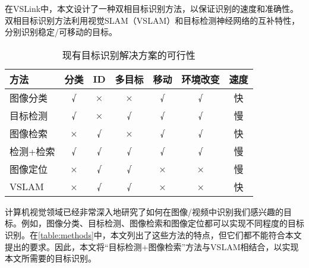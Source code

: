 在VSLink中，本文设计了一种双相目标识别方法，以保证识别的速度和准确性。双相目标识别方法利用视觉SLAM（VSLAM）和目标检测神经网络的互补特性，分别识别稳定/可移动的目标。

\begin{table}[htbp]
	  \centering
	  \caption{\label{table:methods}现有目标识别解决方案的可行性}
	  \begin{tabular}{|l|c|c|c|c|c|c|}\hline
	  方法 &
		分类 &
		ID &
		多目标 &
		移动 &
		环境改变 &
		速度 \\
		\hline 图像分类\cite{he2019bag} &
		{\color[HTML]{355421} √} &
		{\color[HTML]{BF0000} ×} &
		{\color[HTML]{BF0000} ×} &
		{\color[HTML]{355421} √} &
		{\color[HTML]{355421} √} &
		{\color[HTML]{355421} 快} \\ \hline
	  目标检测\cite{zou2019object} &
		{\color[HTML]{355421} √} &
		{\color[HTML]{BF0000} ×} &
		{\color[HTML]{355421} √} &
		{\color[HTML]{355421} √} &
		{\color[HTML]{355421} √} &
		{\color[HTML]{BF0000} 慢} \\ \hline
	  图像检索\cite{philbin2008lost,zheng2017sift} &
		{\color[HTML]{BF0000} ×} &
		{\color[HTML]{355421} √} &
		{\color[HTML]{BF0000} ×} &
		{\color[HTML]{355421} √} &
		{\color[HTML]{355421} √} &
		{\color[HTML]{355421} 快} \\ \hline
	  检测+检索 &
		{\color[HTML]{355421} √} &
		{\color[HTML]{355421} √} &
		{\color[HTML]{355421} √} &
		{\color[HTML]{355421} √} &
		{\color[HTML]{355421} √} &
		{\color[HTML]{BF0000} 慢} \\ \hline
	  图像定位\cite{sattler2011fast} &
		{\color[HTML]{BF0000} ×} &
		{\color[HTML]{355421} √} &
		{\color[HTML]{355421} √} &
		{\color[HTML]{BF0000} ×} &
		{\color[HTML]{BF0000} ×} &
		{\color[HTML]{BF0000} 慢} \\ \hline
	  VSLAM\cite{liu2021edgesharing} &
		{\color[HTML]{BF0000} ×} &
		{\color[HTML]{355421} √} &
		{\color[HTML]{355421} √} &
		{\color[HTML]{BF0000} ×} &
		{\color[HTML]{BF0000} ×} &
		{\color[HTML]{355421} 快} \\ \hline
	  \end{tabular}
	\end{table}
  
计算机视觉领域已经非常深入地研究了如何在图像/视频中识别我们感兴趣的目标。例如，图像分类\cite{he2019bag}、目标检测\cite{zou2019object}、图像检索\cite{philbin2008lost,zheng2017sift}和图像定位\cite{sattler2011fast}都可以实现不同程度的目标识别。在\autoref{table:methods}中，本文列出了这些方法的特点，但它们都不能符合本文提出的要求。因此，本文将“目标检测+图像检索”方法与VSLAM相结合，以实现本文所需要的目标识别。

